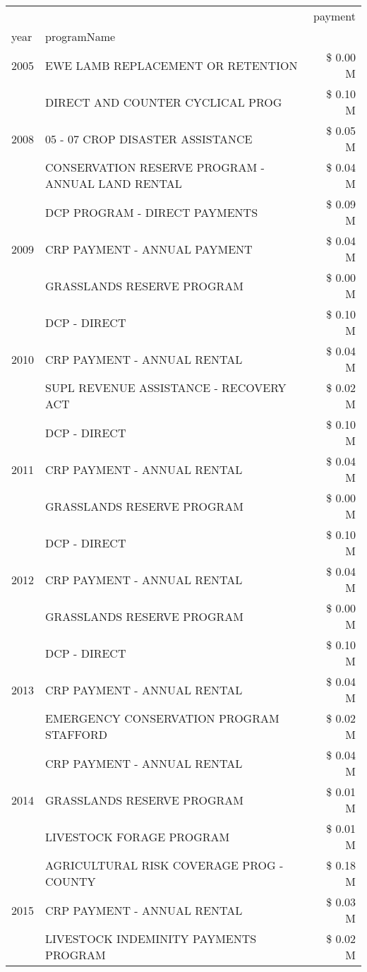 \begin{tabular}{llr}
\toprule
 &  & payment \\
year & programName &  \\
\midrule
2005 & EWE LAMB REPLACEMENT OR RETENTION & \$ 0.00 M \\
\cline{1-3}
\multirow[t]{3}{*}{2008} & DIRECT AND COUNTER CYCLICAL PROG & \$ 0.10 M \\
 & 05 - 07 CROP DISASTER ASSISTANCE & \$ 0.05 M \\
 & CONSERVATION RESERVE PROGRAM - ANNUAL LAND RENTAL & \$ 0.04 M \\
\cline{1-3}
\multirow[t]{3}{*}{2009} & DCP PROGRAM - DIRECT PAYMENTS & \$ 0.09 M \\
 & CRP PAYMENT - ANNUAL PAYMENT & \$ 0.04 M \\
 & GRASSLANDS RESERVE PROGRAM & \$ 0.00 M \\
\cline{1-3}
\multirow[t]{3}{*}{2010} & DCP - DIRECT & \$ 0.10 M \\
 & CRP PAYMENT - ANNUAL RENTAL & \$ 0.04 M \\
 & SUPL REVENUE ASSISTANCE - RECOVERY ACT & \$ 0.02 M \\
\cline{1-3}
\multirow[t]{3}{*}{2011} & DCP - DIRECT & \$ 0.10 M \\
 & CRP PAYMENT - ANNUAL RENTAL & \$ 0.04 M \\
 & GRASSLANDS RESERVE PROGRAM & \$ 0.00 M \\
\cline{1-3}
\multirow[t]{3}{*}{2012} & DCP - DIRECT & \$ 0.10 M \\
 & CRP PAYMENT - ANNUAL RENTAL & \$ 0.04 M \\
 & GRASSLANDS RESERVE PROGRAM & \$ 0.00 M \\
\cline{1-3}
\multirow[t]{3}{*}{2013} & DCP - DIRECT & \$ 0.10 M \\
 & CRP PAYMENT - ANNUAL RENTAL & \$ 0.04 M \\
 & EMERGENCY CONSERVATION PROGRAM STAFFORD & \$ 0.02 M \\
\cline{1-3}
\multirow[t]{3}{*}{2014} & CRP PAYMENT - ANNUAL RENTAL & \$ 0.04 M \\
 & GRASSLANDS RESERVE PROGRAM & \$ 0.01 M \\
 & LIVESTOCK FORAGE PROGRAM & \$ 0.01 M \\
\cline{1-3}
\multirow[t]{3}{*}{2015} & AGRICULTURAL RISK COVERAGE PROG - COUNTY & \$ 0.18 M \\
 & CRP PAYMENT - ANNUAL RENTAL & \$ 0.03 M \\
 & LIVESTOCK INDEMINITY PAYMENTS PROGRAM & \$ 0.02 M \\

\end{tabular}
